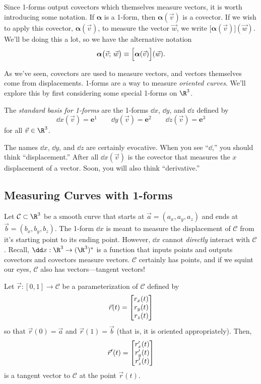 Since 1-forms output covectors which themselves measure vectors, it is worth
introducing some notation.  If $\bm \alpha$ is a 1-form, then
$\bm \alpha(\vec v)$ is a covector.  If we wish to apply this
covector, $\bm\alpha(\vec v)$,
to measure the vector $\vec w$, we write $\Big[\bm\alpha(\vec v)\Big](\vec w)$.
We'll be doing this a lot, so we have the alternative notation
\[
	\bm\alpha\big(\vec v;\, \vec w\big)  \equiv\Big[\bm\alpha(\vec v)\Big](\vec w).
\]


As we've seen, covectors are used to measure vectors, and 
vectors themselves come from displacements.  1-forms are a way
to measure \emph{oriented curves}.  We'll explore this by
first considering some special 1-forms on $\R^3$.

\begin{definition}
	The
	\emph{standard basis for 1-forms} are the 1-forms
	$\dd x$, $\dd y$, and $\dd z$ defined by
	\[
		\dd x(\vec v) = \bm e^1\qquad \dd y(\vec v)=\bm e^2\qquad
		\dd z(\vec v) = \bm e^3
	\]
	for all $\vec v\in \R^3$.
\end{definition}

The names $\dd x$, $\dd y$, and $\dd z$
are certainly evocative.  When you see
``$\dd$,'' you should think ``displacement.''  After all
$\dd x(\vec v)$ is the covector that measures the $x$ displacement
of a vector.  Soon, you will
also think ``derivative.''

\subsection{Measuring Curves with 1-forms}

Let $\mathcal C\subset \R^3$ be a smooth curve that starts at $\vec a=(a_x,a_y,a_z)$
and ends at $\vec b=(b_x,b_y,b_z)$.  The 1-form $\dd x$ is meant to measure the
displacement of $\mathcal C$ from it's starting point to its ending point.
However, $\dd x$ cannot \emph{directly} interact with $\mathcal C$.
Recall, $\dd x:\R^3\to (\R^3)^*$ is a function that inputs points
and outputs covectors and covectors measure vectors.  $\mathcal C$ certainly
has points, and if we squint our eyes, $\mathcal C$ also has vectors---tangent
vectors!

Let $\vec r:[0,1]\to\mathcal C$ be a parameterization of $\mathcal C$ defined by
\[
\vec r(t) = \mat{r_x(t)\\r_y(t)\\r_z(t)}
\]
so that $\vec r(0)=\vec a$ and $\vec r(1)=\vec b$ (that is, it is oriented 
appropriately). Then, 
\[\vec r'(t) =\mat{r_x'(t)\\r_y'(t)\\r_z'(t)}
\]is a tangent vector to $\mathcal C$ at the
point $\vec r(t)$.

